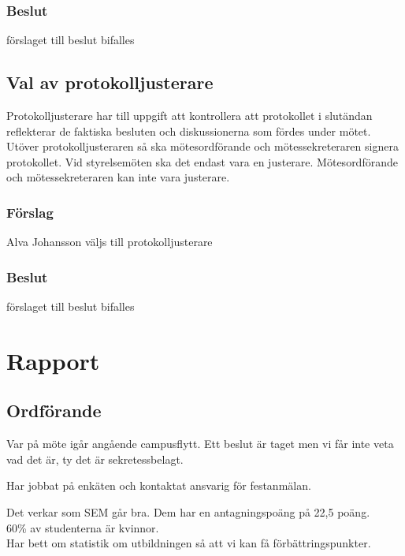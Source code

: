 \documentclass[protokoll]{dvd}
\begin{document}
\subsubsection*{Beslut}
\begin{attsatser}
    \item förslaget till beslut bifalles
\end{attsatser}

\subsection{Val av protokolljusterare}

Protokolljusterare har till uppgift att kontrollera att protokollet i slutändan reflekterar de faktiska besluten och diskussionerna som fördes under mötet.
Utöver protokolljusteraren så ska mötesordförande och mötessekreteraren signera protokollet.
Vid styrelsemöten ska det endast vara en justerare.
Mötesordförande och mötessekreteraren kan inte vara justerare.

\subsubsection*{Förslag}
\begin{attsatser}
    \item Alva Johansson väljs till protokolljusterare
\end{attsatser}
\subsubsection*{Beslut}
\begin{attsatser}
    \item förslaget till beslut bifalles
\end{attsatser}

\section{Rapport}
\subsection{Ordförande}
Var på möte igår angående campusflytt.
Ett beslut är taget men vi får inte veta vad det är, ty det är sekretessbelagt.

Har jobbat på enkäten och kontaktat ansvarig för festanmälan.

Det verkar som SEM går bra. Dem har en antagningspoäng på 22,5 poäng.\\
60\% av studenterna är kvinnor.\\
Har bett om statistik om utbildningen så att vi kan få förbättringspunkter.
\end{document}
